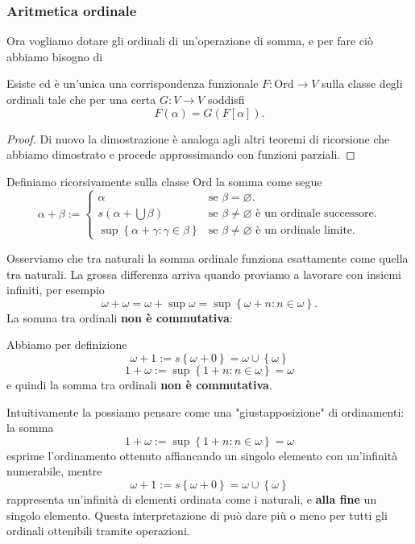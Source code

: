 \documentclass[11pt]{scrartcl}
\newcommand{\eset}{\varnothing}
\begin{document}
 	\subsubsection{Aritmetica ordinale}
 	Ora vogliamo dotare gli ordinali di un'operazione di somma, e per fare ciò abbiamo bisogno di 
 	\begin{theorem}
 		Esiste ed è un'unica una corrispondenza funzionale $F:\text{Ord}\to V$ sulla classe degli ordinali tale che per una certa $G:V\to V$ soddisfi
 		$$F(\alpha)=G(F[\alpha]).$$
 	\end{theorem}
 	\begin{proof}
 		Di nuovo la dimostrazione è analoga agli altri teoremi di ricorsione che abbiamo dimostrato e procede approssimando con funzioni parziali.
 	\end{proof}
 	\begin{definition}
 		Definiamo ricorsivamente sulla classe $\text{Ord}$ la somma come segue
 		$$
 		\alpha + \beta:=
 		\begin{cases}
 			\alpha & \text{se $\beta=\eset$.} \\
 			s(\alpha + \bigcup\beta)  & \text{se $\beta\ne \eset$ è un ordinale successore.}\\
 			\sup\left\{\alpha + \gamma: \gamma\in \beta\right\} & \text{se $\beta\ne \eset$ è un ordinale limite.}
 		\end{cases}
 		$$
 	\end{definition}
 	Osserviamo che tra naturali la somma ordinale funziona esattamente come quella tra naturali. La grossa differenza arriva quando proviamo a lavorare con insiemi infiniti, per esempio 
 	$$\omega+\omega=\omega+\sup \omega=\sup\left\{\omega+n:n\in \omega\right\}.$$
 	La somma tra ordinali \textbf{non è commutativa}:
 	\begin{example}
 		Abbiamo per definizione
 		$$\omega+1:=s\left\{\omega+0\right\}=\omega\cup \left\{\omega\right\}$$
 		$$1+\omega:=\sup\left\{1+n:n\in \omega\right\}=\omega$$
 		e quindi la somma tra ordinali \textbf{non è commutativa}.
 	\end{example}
 	\begin{remark}
 		 Intuitivamente la possiamo pensare come una "giustapposizione" di ordinamenti: la somma
 		 $$1+\omega:=\sup\left\{1+n:n\in \omega\right\}=\omega$$
 		 esprime l'ordinamento ottenuto affiancando un singolo elemento con un'infinità numerabile, mentre 
 		 $$\omega+1:=s\left\{\omega+0\right\}=\omega\cup \left\{\omega\right\}$$
 		 rappresenta un'infinità di elementi ordinata come i naturali, e \textbf{alla fine} un singolo elemento. Questa interpretazione di può dare più o meno per tutti gli ordinali ottenibili tramite operazioni.
 	\end{remark}
\end{document}
